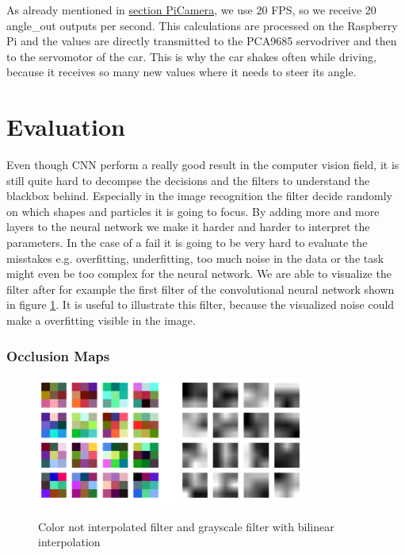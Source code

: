 \documentclass[journal]{IEEEtran}
\begin{document}
As already mentioned in \hyperref[cameramodule]{section PiCamera}, we use 20 FPS, so we receive 20 angle\_out outputs per second. This calculations are processed on the Raspberry Pi and the values are directly transmitted to the PCA9685 servodriver and then to the servomotor of the car. This is why the car shakes often while driving, because it receives so many new values where it needs to steer its angle.


\section{Evaluation}

Even though CNN perform a really good result in the computer vision field, it is still quite hard to decompse the decisions and the filters to understand the blackbox behind. Especially in the image recognition the filter decide randomly on which shapes and particles it is going to focus. By adding more and more layers to the neural network we make it harder and harder to interpret the parameters. In the case of a fail it is going to be very hard to evaluate the misstakes e.g. overfitting, underfitting, too much noise in the data or the task might even be too complex for the neural network. We are able to visualize the filter after for example the first filter of the convolutional neural network shown in figure \ref{filter}. It is useful to illustrate this filter, because the visualized noise could make a overfitting visible in the image. \\

\subsubsection{Occlusion Maps}
\begin{figure}
  \begin{center}
  \includegraphics[width=3.5in]{photo/filter.png}\\
  \caption{Color not interpolated filter and grayscale filter with bilinear interpolation \cite{master}}\label{filter}
  \end{center}
\end{figure}
\end{document}
